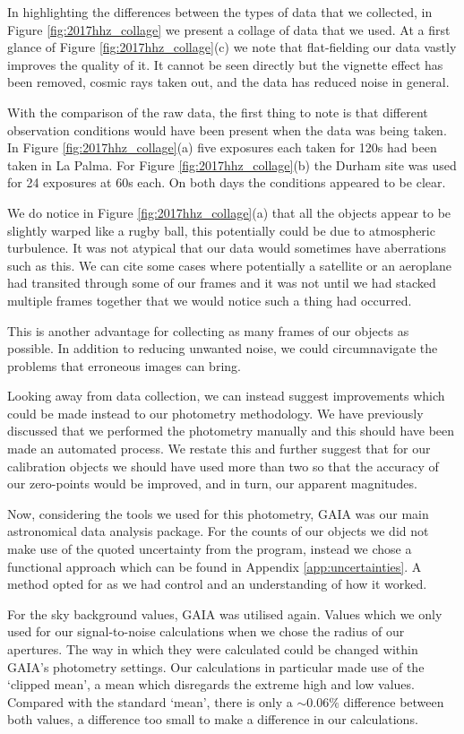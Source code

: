 \documentclass[twocolumn]{revtex4}
\begin{document}
In highlighting the differences between the types of data that we collected, in Figure \ref{fig:2017hhz_collage} we present a collage of data that we used. At a first glance of Figure \ref{fig:2017hhz_collage}(c)  we note that flat-fielding our data vastly improves the quality of it. It cannot be seen directly but the vignette effect has been removed, cosmic rays taken out, and the data has reduced noise in general. 

With the comparison of the raw data, the first thing to note is that different observation conditions would have been present when the data was being taken. In Figure \ref{fig:2017hhz_collage}(a) five exposures each taken for 120s had been taken in La Palma. For Figure \ref{fig:2017hhz_collage}(b) the Durham site was used for 24 exposures at 60s each. On both days the conditions appeared to be clear. 

We do notice in Figure \ref{fig:2017hhz_collage}(a) that all the objects appear to be slightly warped like a rugby ball, this potentially could be due to atmospheric turbulence. It was not atypical that our data would sometimes have aberrations such as this. We can cite some cases where potentially a satellite or an aeroplane had transited through some of our frames and it was not until we had stacked multiple frames together that we would notice such a thing had occurred.

This is another advantage for collecting as many frames of our objects as possible. In addition to reducing unwanted noise, we could circumnavigate the problems that erroneous images can bring. 

Looking away from data collection, we can instead suggest improvements which could be made instead to our photometry methodology. We have previously discussed that we performed the photometry manually and this should have been made an automated process. We restate this and further suggest that for our calibration objects we should have used more than two so that the accuracy of our zero-points would be improved, and in turn, our apparent magnitudes.

Now, considering the tools we used for this photometry, GAIA was our main astronomical data analysis package. For the counts of our objects we did not make use of the quoted uncertainty from the program, instead we chose a functional approach which can be found in Appendix \ref{app:uncertainties}. A method opted for as we had control and an understanding of how it worked.

For the sky background values, GAIA was utilised again. Values which we only used for our signal-to-noise calculations when we chose the radius of our apertures. The way in which they were calculated could be changed within GAIA's photometry settings. Our calculations in particular made use of the `clipped mean', a mean which disregards the extreme high and low values. Compared with the standard `mean', there is only a $\sim 0.06 \%$ difference between both values, a difference too small to make a difference in our calculations.
\end{document}
